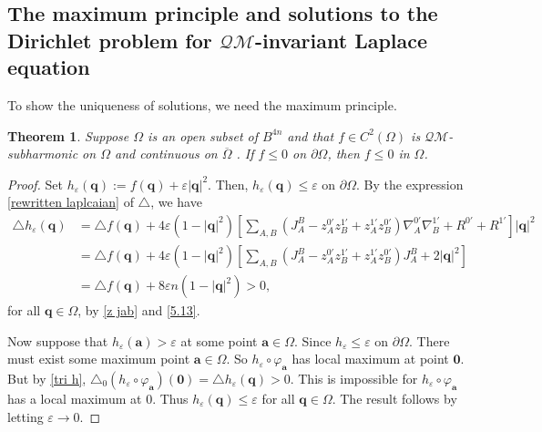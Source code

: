\documentclass[a4paper,11pt]{amsart}
\numberwithin{equation}{section}
\newtheorem{thm}{Theorem}[section]
\begin{document}
\subsection{The maximum principle and solutions to the Dirichlet problem for $\mathcal{QM}$-invariant Laplace equation}
To show the uniqueness of solutions, we need the maximum principle.
\begin{thm}\label{max}
Suppose $\Omega$ is an open subset of $B^{4n}$ and
that $f \in C^2(\Omega)$ is $\mathcal{QM}$-subharmonic on $\Omega$ and continuous on $\overline{\Omega}$ . If $f \leq 0$ on $\partial \Omega$,
then $f \leq 0$ in $\Omega$.
\end{thm}
\begin{proof}
Set $h_{\varepsilon}(\mathbf{q}):=f(\mathbf{q})+\varepsilon|\mathbf{q}|^2$. Then, $h_{\varepsilon}(\mathbf{q})\leq \varepsilon$ on $\partial \Omega$. By the expression \eqref{rewritten laplcaian} of $\triangle$, we have
\begin{equation}\begin{aligned}\label{tri h}
\triangle h_{\varepsilon}(\mathbf{q})&=\triangle f(\mathbf{q})+4\varepsilon(1-|\mathbf{q}|^2)\left[\sum_{A,B}(J_A^B-z_{A}^{0'}z_{B}^{1'}+z_{A}^{1'}z_{B}^{0'})\nabla_A^{0'}\nabla_{B}^{1'}+R^{0'}+R^{1'}\right]|\mathbf{q}|^2\\
&=\triangle f(\mathbf{q})+4\varepsilon(1-|\mathbf{q}|^2)\left[\sum_{A,B}(J_A^B-z_{A}^{0'}z_{B}^{1'}+z_{A}^{1'}z_{B}^{0'})J_A^B+2|\mathbf{q}|^2\right]\\
&=\triangle f(\mathbf{q})+8\varepsilon n(1-|\mathbf{q}|^2)>0,
\end{aligned}\end{equation}
for all $\mathbf{q}\in\Omega$, by \eqref{z jab} and \eqref{5.13}.


Now suppose that $h_{\varepsilon}(\mathbf{a})>\varepsilon$ at some point $\mathbf{a}\in\Omega$. Since $h_{\varepsilon}\leq \varepsilon$ on $\partial\Omega$. There must exist some maximum point $\mathbf{a}\in\Omega$. So $h_{\varepsilon}\circ \varphi_{\mathbf{a}}$ has local maximum at point $\mathbf{0}$. But by \eqref{tri h}, $\triangle_0(h_{\varepsilon}\circ \varphi_{\mathbf{a}})(\mathbf{0})=\triangle h_{\varepsilon}(\mathbf{q})>0$. This is impossible for $h_{\varepsilon}\circ \varphi_{\mathbf{a}}$ has a local maximum at $0$.
Thus $h_{\varepsilon}(\mathbf{q})\leq\varepsilon$ for all $\mathbf{q}\in\Omega$. The result follows by letting $\varepsilon\rightarrow 0$.
\end{proof}
\end{document}
